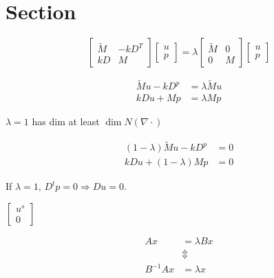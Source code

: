 \documentclass[11pt]{article}
\begin{document}
\section{Section}
\begin{equation}
\begin{bmatrix}
	\tilde{M} & -kD^T \\
	kD & M
\end{bmatrix}
\begin{bmatrix}
	u \\ p
\end{bmatrix}
= 
\lambda
\begin{bmatrix}
\tilde{M} & 0 \\
0 & M
\end{bmatrix}
\begin{bmatrix}
u \\ p
\end{bmatrix}
\end{equation}

\begin{equation}
\begin{split}
	\tilde{M}u - kD^p &= \lambda\tilde{M}u \\
	kDu + Mp &= \lambda Mp
\end{split}
\end{equation}

$\lambda = 1$ has dim at least $\dim N(\nabla\cdot)$

\begin{equation}
\begin{split}
(1-\lambda)\tilde{M}u - kD^p &= 0 \\
kDu + (1-\lambda)Mp &= 0
\end{split}
\end{equation}

If $\lambda = 1$, $D^tp =0 \Rightarrow Du=0$.

$\begin{bmatrix}
u^s \\ 0
\end{bmatrix}$

\begin{equation}
\begin{split}
Ax &= \lambda Bx \\
&\Updownarrow \\
B^{-1}Ax &= \lambda x
\end{split}
\end{equation}
\end{document}
